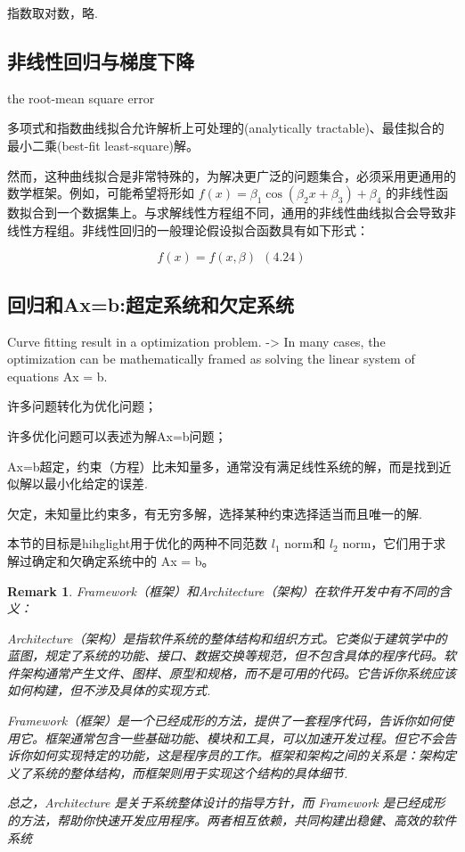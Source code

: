 \documentclass{ctexart}
\newtheorem*{remark}{Remark}
\begin{document}
指数取对数，略.

\subsection{非线性回归与梯度下降}

the root-mean square error 

多项式和指数曲线拟合允许解析上可处理的(analytically tractable)、最佳拟合的最小二乘(best-fit least-square)解。

然而，这种曲线拟合是非常特殊的，为解决更广泛的问题集合，必须采用更通用的数学框架。例如，可能希望将形如 \( f(x) = \beta_1 \cos(\beta_2 x + \beta_3) + \beta_4 \) 的非线性函数拟合到一个数据集上。与求解线性方程组不同，通用的非线性曲线拟合会导致非线性方程组。非线性回归的一般理论假设拟合函数具有如下形式：

\[ f(x) = f(x, \beta) \ \ (4.24) \]


\subsection{回归和Ax=b:超定系统和欠定系统}

Curve fitting result in a optimization problem. -> In many cases, the optimization can be mathematically framed as solving the linear system of equations Ax = b.

许多问题转化为优化问题；

许多优化问题可以表述为解Ax=b问题；

Ax=b超定，约束（方程）比未知量多，通常没有满足线性系统的解，而是找到近似解以最小化给定的误差.

欠定，未知量比约束多，有无穷多解，选择某种约束选择适当而且唯一的解.

本节的目标是hihglight用于优化的两种不同范数 \(l_1\) norm和 \(l_2\) norm，它们用于求解过确定和欠确定系统中的 Ax = b。

    \begin{remark}
        Framework（框架）和Architecture（架构）在软件开发中有不同的含义：

        Architecture（架构）是指软件系统的整体结构和组织方式。它类似于建筑学中的蓝图，规定了系统的功能、接口、数据交换等规范，但不包含具体的程序代码。软件架构通常产生文件、图样、原型和规格，而不是可用的代码。它告诉你系统应该如何构建，但不涉及具体的实现方式.
        
        Framework（框架）是一个已经成形的方法，提供了一套程序代码，告诉你如何使用它。框架通常包含一些基础功能、模块和工具，可以加速开发过程。但它不会告诉你如何实现特定的功能，这是程序员的工作。框架和架构之间的关系是：架构定义了系统的整体结构，而框架则用于实现这个结构的具体细节.
        
        总之，Architecture 是关于系统整体设计的指导方针，而 Framework 是已经成形的方法，帮助你快速开发应用程序。两者相互依赖，共同构建出稳健、高效的软件系统
    \end{remark}
\end{document}
